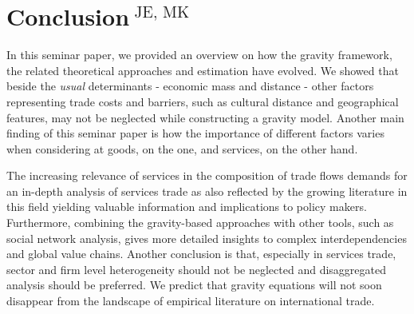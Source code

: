 \section[Conclusion]{Conclusion$^{\text{ JE, MK}}$}
\label{sec:conclusion}

In this seminar paper, we provided an overview on how the gravity framework, the related theoretical approaches and estimation have evolved. We showed that beside the \textit{usual} determinants - economic mass and distance - other factors representing trade costs and barriers, such as cultural distance and geographical features, may not be neglected while constructing a gravity model. Another main finding of this seminar paper is how the importance of different factors varies when considering at goods, on the one, and services, on the other hand. 

The increasing relevance of services in the composition of trade flows demands for an in-depth analysis of services trade as also reflected by the growing literature in this field yielding valuable information and implications to policy makers. Furthermore, combining the gravity-based approaches with other tools, such as social network analysis, gives more detailed insights to complex interdependencies and global value chains. Another conclusion is that, especially in services trade, sector and firm level heterogeneity should not be neglected and disaggregated analysis should be preferred. We predict that gravity equations will not soon disappear from the landscape of empirical literature on international trade. 






















































